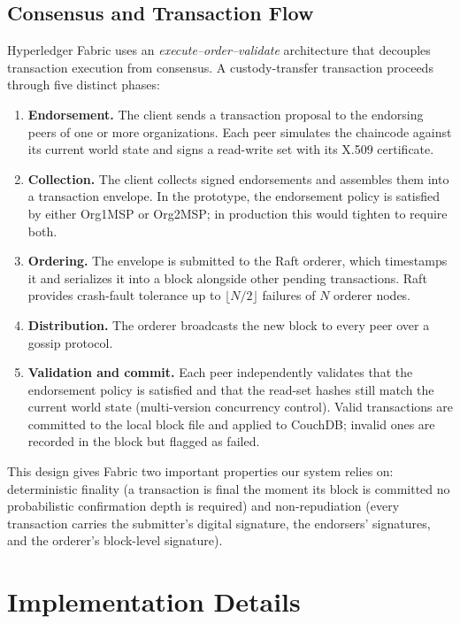 \documentclass[conference]{IEEEtran}
\begin{document}
\subsection{Consensus and Transaction Flow}

Hyperledger Fabric uses an \emph{execute--order--validate} architecture
that decouples transaction execution from consensus.  A custody-transfer
transaction proceeds through five distinct phases:

\begin{enumerate}
  \item \textbf{Endorsement.}  The client sends a transaction proposal to
    the endorsing peers of one or more organizations.  Each peer simulates
    the chaincode against its current world state and signs a read-write
    set with its X.509 certificate.
  \item \textbf{Collection.}  The client collects signed endorsements and
    assembles them into a transaction envelope.  In the prototype, the
    endorsement policy is satisfied by either Org1MSP or Org2MSP; in
    production this would tighten to require both.
  \item \textbf{Ordering.}  The envelope is submitted to the Raft orderer,
    which timestamps it and serializes it into a block alongside other
    pending transactions.  Raft provides crash-fault tolerance up to
    $\lfloor N/2 \rfloor$ failures of $N$ orderer nodes.
  \item \textbf{Distribution.}  The orderer broadcasts the new block to
    every peer over a gossip protocol.
  \item \textbf{Validation and commit.}  Each peer independently
    validates that the endorsement policy is satisfied and that the
    read-set hashes still match the current world state (multi-version
    concurrency control).  Valid transactions are committed to the local
    block file and applied to CouchDB; invalid ones are recorded in the
    block but flagged as failed.
\end{enumerate}

This design gives Fabric two important properties our system relies on:
deterministic finality (a transaction is final the moment its block is
committed  no probabilistic confirmation depth is required) and
non-repudiation (every transaction carries the submitter's digital
signature, the endorsers' signatures, and the orderer's block-level
signature).

\section{Implementation Details}
\end{document}
